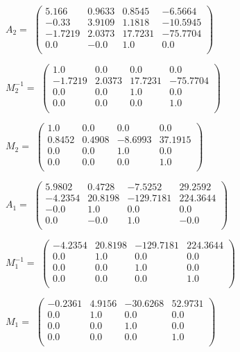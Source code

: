 \documentclass{article}
\begin{document}
    $A_2 = $
    $
    \left(\begin{matrix}
        5.166 & 0.9633 & 0.8545 & -6.5664 \\
        -0.33 & 3.9109 & 1.1818 & -10.5945 \\
        -1.7219 & 2.0373 & 17.7231 & -75.7704 \\
        0.0 & -0.0 & 1.0 & 0.0 \\
    \end{matrix}\right)
    $

    $M^{-1}_2 = $
    $
    \left(\begin{matrix}
        1.0 & 0.0 & 0.0 & 0.0 \\
        -1.7219 & 2.0373 & 17.7231 & -75.7704 \\
        0.0 & 0.0 & 1.0 & 0.0 \\
        0.0 & 0.0 & 0.0 & 1.0 \\
    \end{matrix}\right)
    $

    $M_2 = $
    $
    \left(\begin{matrix}
        1.0 & 0.0 & 0.0 & 0.0 \\
        0.8452 & 0.4908 & -8.6993 & 37.1915 \\
        0.0 & 0.0 & 1.0 & 0.0 \\
        0.0 & 0.0 & 0.0 & 1.0 \\
    \end{matrix}\right)
    $

    $A_1 = $
    $
    \left(\begin{matrix}
        5.9802 & 0.4728 & -7.5252 & 29.2592 \\
        -4.2354 & 20.8198 & -129.7181 & 224.3644 \\
        -0.0 & 1.0 & 0.0 & 0.0 \\
        0.0 & -0.0 & 1.0 & -0.0 \\
    \end{matrix}\right)
    $

    $M^{-1}_1 = $
    $
    \left(\begin{matrix}
        -4.2354 & 20.8198 & -129.7181 & 224.3644 \\
        0.0 & 1.0 & 0.0 & 0.0 \\
        0.0 & 0.0 & 1.0 & 0.0 \\
        0.0 & 0.0 & 0.0 & 1.0 \\
    \end{matrix}\right)
    $

    $M_1 = $
    $
    \left(\begin{matrix}
        -0.2361 & 4.9156 & -30.6268 & 52.9731 \\
        0.0 & 1.0 & 0.0 & 0.0 \\
        0.0 & 0.0 & 1.0 & 0.0 \\
        0.0 & 0.0 & 0.0 & 1.0 \\
    \end{matrix}\right)
    $
\end{document}
